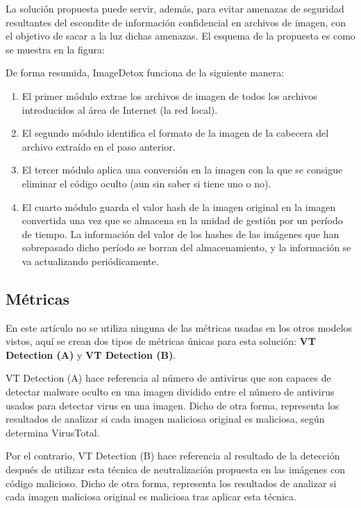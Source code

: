La solución propuesta puede servir, además, para evitar amenazas de seguridad resultantes del escondite de información confidencial en archivos de imagen, con el objetivo de sacar a la luz dichas amenazas. El esquema de la propuesta es como se muestra en la figura:


De forma resumida, ImageDetox funciona de la siguiente manera:
\begin{enumerate}
\item  El primer módulo extrae los archivos de imagen de todos los archivos introducidos al área de Internet (la red local).
\item El segundo módulo identifica el formato de la imagen de la cabecera del archivo extraído en el paso anterior.
\item El tercer módulo aplica una conversión en la imagen con la que se consigue eliminar el código oculto (aun sin saber si tiene uno o no).
\item El cuarto módulo guarda el valor hash de la imagen original en la imagen convertida una vez que se almacena en la unidad de gestión por un período de tiempo. La información del valor de los hashes de las imágenes que han sobrepasado dicho período se borran del almacenamiento, y la información se va  actualizando periódicamente.
\end{enumerate}

\subsection{Métricas}

En este artículo no se utiliza ninguna de las métricas usadas en los otros modelos vistos, aquí se crean dos tipos de métricas únicas para esta solución: \textbf{VT Detection (A)} y \textbf{VT Detection (B)}.

VT Detection (A) hace referencia al número de antivirus que son capaces de detectar malware oculto en una imagen dividido entre el número de antivirus usados para detectar virus en una imagen. Dicho de otra forma, representa los resultados de analizar si cada imagen maliciosa original es maliciosa, según determina VirusTotal. %

Por el contrario, VT Detection (B) hace referencia al resultado de la detección después de utilizar esta técnica de neutralización propuesta en las imágenes con código malicioso. Dicho de otra forma, representa los resultados de analizar si cada imagen maliciosa original es maliciosa tras aplicar esta técnica.